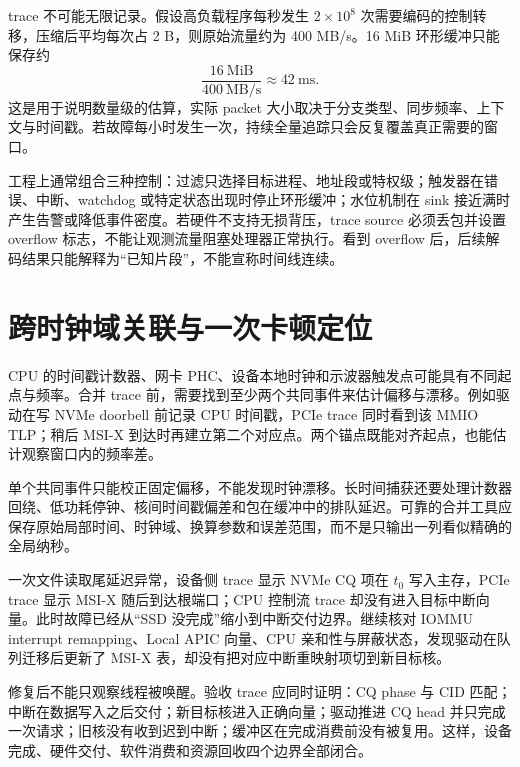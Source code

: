 trace 不可能无限记录。假设高负载程序每秒发生 $2\times10^8$ 次需要编码的控制转移，压缩后平均每次占 2 B，则原始流量约为 400 MB/s。16 MiB 环形缓冲只能保存约
\[
  \frac{16\ \mathrm{MiB}}{400\ \mathrm{MB/s}} \approx 42\ \mathrm{ms}.
\]
这是用于说明数量级的估算，实际 packet 大小取决于分支类型、同步频率、上下文与时间戳。若故障每小时发生一次，持续全量追踪只会反复覆盖真正需要的窗口。

工程上通常组合三种控制：过滤只选择目标进程、地址段或特权级；触发器在错误、中断、watchdog 或特定状态出现时停止环形缓冲；水位机制在 sink 接近满时产生告警或降低事件密度。若硬件不支持无损背压，trace source 必须丢包并设置 overflow 标志，不能让观测流量阻塞处理器正常执行。看到 overflow 后，后续解码结果只能解释为“已知片段”，不能宣称时间线连续。

\section{跨时钟域关联与一次卡顿定位}

CPU 的时间戳计数器、网卡 PHC、设备本地时钟和示波器触发点可能具有不同起点与频率。合并 trace 前，需要找到至少两个共同事件来估计偏移与漂移。例如驱动在写 NVMe doorbell 前记录 CPU 时间戳，PCIe trace 同时看到该 MMIO TLP；稍后 MSI-X 到达时再建立第二个对应点。两个锚点既能对齐起点，也能估计观察窗口内的频率差。

单个共同事件只能校正固定偏移，不能发现时钟漂移。长时间捕获还要处理计数器回绕、低功耗停钟、核间时间戳偏差和包在缓冲中的排队延迟。可靠的合并工具应保存原始局部时间、时钟域、换算参数和误差范围，而不是只输出一列看似精确的全局纳秒。


一次文件读取尾延迟异常，设备侧 trace 显示 NVMe CQ 项在 $t_0$ 写入主存，PCIe trace 显示 MSI-X 随后到达根端口；CPU 控制流 trace 却没有进入目标中断向量。此时故障已经从“SSD 没完成”缩小到中断交付边界。继续核对 IOMMU interrupt remapping、Local APIC 向量、CPU 亲和性与屏蔽状态，发现驱动在队列迁移后更新了 MSI-X 表，却没有把对应中断重映射项切到新目标核。

修复后不能只观察线程被唤醒。验收 trace 应同时证明：CQ phase 与 CID 匹配；中断在数据写入之后交付；新目标核进入正确向量；驱动推进 CQ head 并只完成一次请求；旧核没有收到迟到中断；缓冲区在完成消费前没有被复用。这样，设备完成、硬件交付、软件消费和资源回收四个边界全部闭合。

